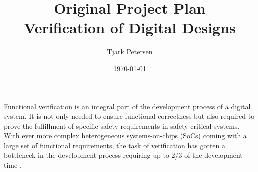 \documentclass[11pt]{article}
\begin{document}
\title{{\Huge Original Project Plan}\\ Verification of Digital Designs}
\author{Tjark Petersen}
\date{\today}

\maketitle


\begin{comment}
- verification important -> not only for functional correctness, but required for safety-critical systems
- in the critical path of the development process \cite{bergeron2012writing}
- consumes more than 2/3 of the development time \cite{bergeron2012writing}
- dedicated verification engineers
- intricate process, not any more just writing a testbench with some directed test cases
- complex environments, complex SoCs, random stimulus, coverage-driven verification, formal verification, etc.
- abstraction can help to manage complexity \cite{bergeron2012writing}
- but we have balance control and abstraction \cite{bergeron2012writing}



- HVLs were introduced to abstract and ease testbench development
- intially co-simulation based like Vera added crv, OOP, etc.
- today SV merged SuperLog and Vera -> single language

- SV alone provides primitives for creation of best practice test environments
- but no guidlines of how to do so -> no reuse
- UVM introduces framework for creation of sophisticated testbenches in SV which encourage reuse by providing guidelines and class hierarchies \cite{flake2020a}
- standard from 2017




- "all verification projects present a recurring set of challenges; hence, valuable time and effort are saved by reusing code common to all environments. This is achieved with a software library that provides verification facilities such as error reporting and communications handshaking" \cite{flake2020a}


\end{comment}

Functional verification is an integral part of the development process of a digital system. It is not only needed to ensure functional correctness but also required to prove the fulfillment of specific safety requirements in safety-critical systems. 
With ever more complex heterogeneous systems-on-chips (SoCs) coming with a large set of functional requirements, the task of verification has gotten a bottleneck in the development process requiring up to 2/3 of the development time \cite{bergeron2012writing}.
\end{document}
